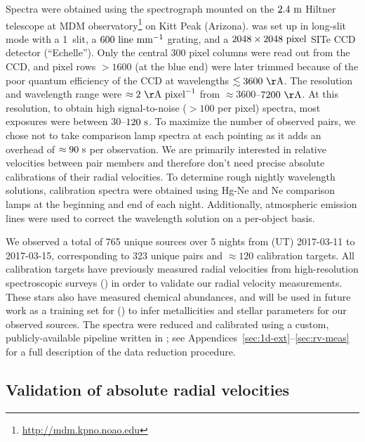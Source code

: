 \documentclass[modern, letterpaper]{aastex61}
\begin{document}
Spectra were obtained using the  spectrograph mounted on the
$2.4~{\rm m}$ Hiltner telescope at MDM
observatory\footnote{\url{http://mdm.kpno.noao.edu}} on Kitt Peak (Arizona).
 was set up in long-slit mode with a 1\arcsec\ slit, a
$600~{\rm line}~{\rm mm}^{-1}$ grating, and a $2048\times2048~{\rm pixel}$ SITe
CCD detector (``Echelle'').
Only the central 300 pixel columns were read out from the CCD, and pixel rows
$>1600$ (at the blue end) were later trimmed because of the poor quantum
efficiency of the CCD at wavelengths $\lesssim 3600~{\rm \AA}$.
The resolution and wavelength range were $\approx2~{\rm \AA}~{\rm pixel}^{-1}$
from $\approx 3600$--$7200~{\rm \AA}$.
At this resolution, to obtain high signal-to-noise ($>100$ per pixel) spectra,
most exposures were between $30$--$120~{\rm s}$.
To maximize the number of observed pairs, we chose not to take
comparison lamp spectra at each pointing as it adds an overhead of $\approx
90~{\rm s}$ per observation.
We are primarily interested in relative velocities between pair members and
therefore don't need precise absolute calibrations of their radial velocities.
To determine rough nightly wavelength solutions, calibration spectra were
obtained using Hg-Ne and Ne comparison lamps at the beginning and end of each
night.
Additionally, atmospheric emission lines were used to correct the wavelength
solution on a per-object basis.

We observed a total of 765 unique sources over 5 nights from (UT) 2017-03-11 to
2017-03-15, corresponding to 323 unique pairs and $\approx 120$
calibration targets.
All calibration targets have previously measured radial velocities from
high-resolution spectroscopic surveys (\citealt{Bensby:2014,Pinsonneault:2014})
in order to validate our radial velocity measurements.
These stars also have measured chemical abundances, and will be used in future
work as a training set for  (\citealt{Ness:2015}) to infer
metallicities and stellar parameters for our observed sources.
The spectra were reduced and calibrated using a custom, publicly-available
pipeline written in \python; see Appendices~\ref{sec:1d-ext}--\ref{sec:rv-meas}
for a full description of the data reduction procedure.

\subsection{Validation of absolute radial velocities}\label{sec:rv-validation}
\end{document}
